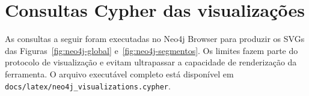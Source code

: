 \documentclass[10pt,a4paper]{article}
\begin{document}
\clearpage
\appendix
\section{Consultas Cypher das visualizações}

As consultas a seguir foram executadas no Neo4j Browser para produzir os SVGs das Figuras~\ref{fig:neo4j-global} e~\ref{fig:neo4j-segmentos}. Os limites fazem parte do protocolo de visualização e evitam ultrapassar a capacidade de renderização da ferramenta. O arquivo executável completo está disponível em \texttt{docs/latex/neo4j\_visualizations.cypher}.









\printbibliography[title={Referências}]
\end{document}
